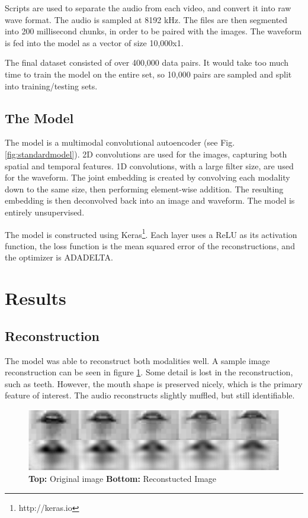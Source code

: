 \documentclass[conference]{IEEEtran}
\begin{document}
Scripts are used to separate the audio from each video, and convert it into raw wave format. The audio is sampled at 8192 kHz. The files are then segmented into 200 millisecond chunks, in order to be paired with the images. The waveform is fed into the model as a vector of size 10,000x1.

The final dataset consisted of over 400,000 data pairs. It would take too much time to train the model on the entire set, so 10,000 pairs are sampled and split into training/testing sets.

\subsection{The Model}
The model is a multimodal convolutional autoencoder (see Fig. \ref{fig:standardmodel}). 2D convolutions are used for the images, capturing both spatial and temporal features. 1D convolutions, with a large filter size, are used for the waveform. The joint embedding is created by convolving each modality down to the same size, then performing element-wise addition. The resulting embedding is then deconvolved back into an image and waveform. The model is entirely unsupervised.

The model is constructed using Keras\footnote{http://keras.io}. Each layer uses a ReLU as its activation function, the loss function is the mean squared error of the reconstructions, and the optimizer is ADADELTA.\cite{Nair2010}\cite{Zeiler2012}

\section{Results}
\subsection{Reconstruction}
The model was able to reconstruct both modalities well. A sample image reconstruction can be seen in figure \ref{fig:imgrecon}. Some detail is lost in the reconstruction, such as teeth. However, the mouth shape is preserved nicely, which is the primary feature of interest. The audio reconstructs slightly muffled, but still identifiable.

\begin{figure}[h]
\centering
\includegraphics[scale=0.5]{imgrecon}
\caption{\textbf{Top:} Original image \textbf{Bottom:} Reconstucted Image}
\label{fig:imgrecon}
\end{figure}
\end{document}
